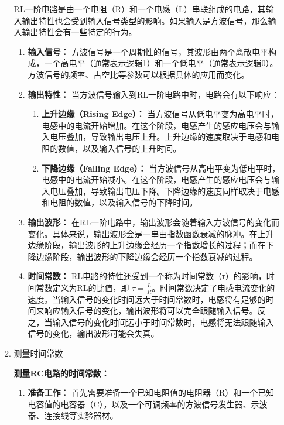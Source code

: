 \documentclass[dvipsnames, svgnames,a4paper,11pt]{article}
\begin{document}
\begin{enumerate}
\begin{enumerate}
			RL一阶电路是由一个电阻（R）和一个电感（L）串联组成的电路，其输入输出特性也会受到输入信号类型的影响。如果输入是方波信号，那么输入输出特性会有一些特定的行为。
			
			\begin{enumerate}
				\item \textbf{输入信号：} 方波信号是一个周期性的信号，其波形由两个离散电平构成，一个高电平（通常表示逻辑1）和一个低电平（通常表示逻辑0）。方波信号的频率、占空比等参数可以根据具体的应用而变化。
				
				\item \textbf{输出特性：} 当方波信号输入到RL一阶电路中时，电路会有以下响应：
				\begin{enumerate}
					\item \textbf{上升边缘（Rising Edge）：} 当方波信号从低电平变为高电平时，电感中的电流开始增加。在这个阶段，电感产生的感应电压会与输入电压叠加，导致输出电压上升。上升边缘的速度取决于电感和电阻的数值，以及输入信号的上升时间。
					
					\item \textbf{下降边缘（Falling Edge）：} 当方波信号从高电平变为低电平时，电感中的电流开始减小。在这个阶段，电感产生的感应电压会与输入电压叠加，导致输出电压下降。下降边缘的速度同样取决于电感和电阻的数值，以及输入信号的下降时间。
				\end{enumerate}
				
				\item \textbf{输出波形：} 在RL一阶电路中，输出波形会随着输入方波信号的变化而变化。具体来说，输出波形会是一串由指数函数衰减的脉冲。在上升边缘阶段，输出波形的上升边缘会经历一个指数增长的过程；而在下降边缘阶段，输出波形的下降边缘会经历一个指数衰减的过程。
				
				\item \textbf{时间常数：} RL电路的特性还受到一个称为时间常数（τ）的影响，时间常数定义为RL的比值，即 \( \tau = \frac{L}{R} \)。时间常数决定了电感电流变化的速度。当输入信号的变化时间远大于时间常数时，电感将有足够的时间来响应输入信号的变化，输出波形将可以完全跟随输入信号。反之，当输入信号的变化时间远小于时间常数时，电感将无法跟随输入信号的变化，输出波形可能会失真。
			\end{enumerate}
			
			\item 测量时间常数
			
			\textbf{测量RC电路的时间常数：}
			
			\begin{enumerate}
				\item \textbf{准备工作：} 首先需要准备一个已知电阻值的电阻器（R）和一个已知电容值的电容器（C），以及一个可调频率的方波信号发生器、示波器、连接线等实验器材。
				

\end{enumerate}
\end{enumerate}
\end{enumerate}
\end{document}
